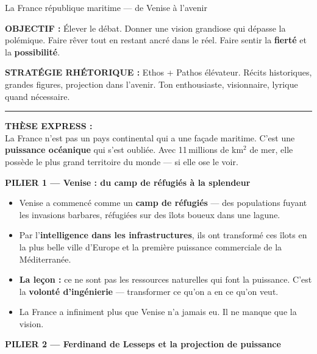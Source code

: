 \documentclass[a4paper,11pt]{article}
\begin{document}
\begin{fichevert}{La France r\'{e}publique maritime --- de Venise \`{a} l'avenir}

\textbf{OBJECTIF :} \'{E}lever le d\'{e}bat. Donner une vision grandiose qui d\'{e}passe la pol\'{e}mique. Faire r\^{e}ver tout en restant ancr\'{e} dans le r\'{e}el. Faire sentir la \textbf{fiert\'{e}} et la \textbf{possibilit\'{e}}.

\textbf{STRAT\'{E}GIE RH\'{E}TORIQUE :} Ethos + Pathos \'{e}l\'{e}vateur. R\'{e}cits historiques, grandes figures, projection dans l'avenir. Ton enthousiaste, visionnaire, lyrique quand n\'{e}cessaire.

\rule{\textwidth}{0.3pt}

\textbf{\color{ModeVert}TH\`{E}SE EXPRESS :}\\
La France n'est pas un pays continental qui a une fa\c{c}ade maritime. C'est une \textbf{puissance oc\'{e}anique} qui s'est oubli\'{e}e. Avec 11\,millions de km$^2$ de mer, elle poss\`{e}de le plus grand territoire du monde --- si elle ose le voir.

\vspace{0.3cm}
\textbf{\color{ModeVert}PILIER 1 --- Venise : du camp de r\'{e}fugi\'{e}s \`{a} la splendeur}

\begin{itemize}[nosep, label=\color{ModeVert}]
  \item Venise a commenc\'{e} comme un \textbf{camp de r\'{e}fugi\'{e}s} --- des populations fuyant les invasions barbares, r\'{e}fugi\'{e}es sur des \^{i}lots boueux dans une lagune.
  \item Par l'\textbf{intelligence dans les infrastructures}, ils ont transform\'{e} ces \^{i}lots en la plus belle ville d'Europe et la premi\`{e}re puissance commerciale de la M\'{e}diterran\'{e}e.
  \item \textbf{La le\c{c}on :} ce ne sont pas les ressources naturelles qui font la puissance. C'est la \textbf{volont\'{e} d'ing\'{e}nierie} --- transformer ce qu'on a en ce qu'on veut.
  \item La France a infiniment plus que Venise n'a jamais eu. Il ne manque que la vision.
\end{itemize}

\vspace{0.3cm}
\textbf{\color{ModeVert}PILIER 2 --- Ferdinand de Lesseps et la projection de puissance}


\end{fichevert}
\end{document}
